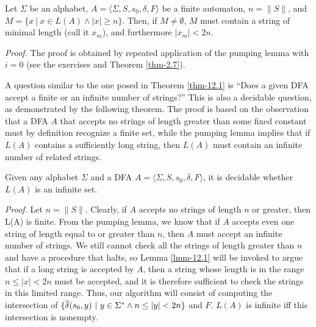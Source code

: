 \begin{lmm}\label{lmm-12.1}
Let $\Sigma$ be an alphabet, $A=\langle\Sigma,S,s_0,\delta,F\rangle$ be a finite
automaton, $n=\|S\|$, and $M=\{x\ |\ x\in L(A)\wedge |x|\geq n\}$. Then, if $M\not=
\emptyset$, $M$ must contain a string of minimal length (call it $x_m$), and
furthermore $|x_m| < 2n$.

\emph{Proof.} The proof is obtained by repeated application of the pumping lemma
with $i=0$ (see the exercises and Theorem \ref{thm-2.7}).
\end{lmm}

A question similar to the one posed in Theorem \ref{thm-12.1} is ``Does a given DFA
accept a finite or an infinite number of strings?'' This is also a decidable
question, as demonstrated by the following theorem. The proof is based on the
observation that a DFA $A$ that accepts no strings of length greater than some
fixed constant must by definition recognize a finite set, while the pumping
lemma implies that if $L(A)$ contains a sufficiently long string, then $L(A)$
must contain an infinite number of related strings.

\begin{thm}\label{thm-12.2}
Given any alphabet $\Sigma$ and a DFA $A=\langle\Sigma,S,s_0,\delta,F\rangle$,
it is decidable whether $L(A)$ is an infinite set.

\emph{Proof.} Let $n=\|S\|$. Clearly, if $A$ accepts no strings of length $n$ or
greater, then L(A) is finite. From the pumping lemma, we know that if $A$
accepts even one string of length equal to or greater than $n$, then $A$ must
accept an infinite number of strings. We still cannot check all the strings of
length greater than $n$ and have a procedure that halts, so Lemma \ref{lmm-12.1} will be
invoked to argue that if a long string is accepted by $A$, then a string whose
length is in the range $n\leq |x| < 2n$ must be accepted, and it is therefore
sufficient to check the strings in this limited range. Thus, our algorithm will
consist of computing the intersection of $\{\DBAR(s_0,y)\ |\ y\in\Sigma^*\wedge n
\leq |y| < 2n\}$ and $F$. $L(A)$ is infinite iff this intersection is
nonempty.
\end{thm}

